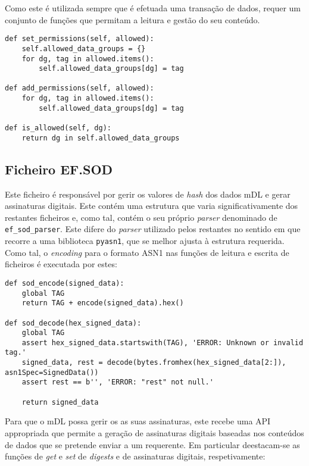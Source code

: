 Como este é utilizada sempre que é efetuada uma transação de dados, requer um conjunto de funções que permitam a leitura e gestão do seu conteúdo.

\begin{verbatim}
def set_permissions(self, allowed):
    self.allowed_data_groups = {}
    for dg, tag in allowed.items():
        self.allowed_data_groups[dg] = tag

def add_permissions(self, allowed):
    for dg, tag in allowed.items():
        self.allowed_data_groups[dg] = tag

def is_allowed(self, dg):
    return dg in self.allowed_data_groups
\end{verbatim}


\subsection{Ficheiro EF.SOD}

Este ficheiro é responsável por gerir os valores de \textit{hash} dos dados mDL e gerar assinaturas digitais. Este contém uma estrutura que varia significativamente dos restantes ficheiros e, como tal, contém o seu próprio \textit{parser} denominado de \texttt{ef\_sod\_parser}. Este difere do \textit{parser} utilizado pelos restantes no sentido em que recorre a uma biblioteca \texttt{pyasn1}, que se melhor ajusta à estrutura requerida. Como tal, o \textit{encoding} para o formato ASN1 nas funções de leitura e escrita de ficheiros é executada por estes:

\begin{verbatim}
def sod_encode(signed_data):
    global TAG
    return TAG + encode(signed_data).hex()

def sod_decode(hex_signed_data):
    global TAG
    assert hex_signed_data.startswith(TAG), 'ERROR: Unknown or invalid tag.'
    signed_data, rest = decode(bytes.fromhex(hex_signed_data[2:]), asn1Spec=SignedData())
    assert rest == b'', 'ERROR: "rest" not null.'

    return signed_data
\end{verbatim}

Para que o mDL possa gerir os as suas assinaturas, este recebe uma API appropriada que permite a geração de assinaturas digitais baseadas nos conteúdos de dados que se pretende enviar a um requerente. Em particular deestacam-se as funções de \textit{get} e \textit{set} de \textit{digests} e de assinaturas digitais, respetivamente:

